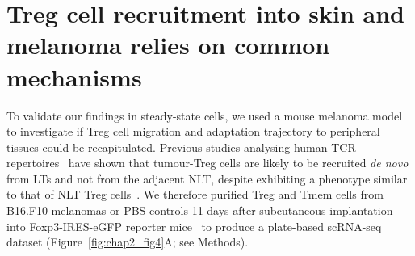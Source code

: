 \section{Treg cell recruitment into skin and melanoma relies on common mechanisms}
\label{section2.5}
To validate our findings in steady-state cells, we used a mouse melanoma model to investigate if Treg cell migration and adaptation trajectory to peripheral tissues could be recapitulated. Previous studies analysing human TCR repertoires~\citep{Sherwood2013-jf,Plitas2016-rg} have shown that tumour-Treg cells are likely to be recruited \textit{de novo} from LTs and not from the adjacent NLT, despite exhibiting a phenotype similar to that of NLT Treg cells~\citep{Plitas2016-rg,De_Simone2016-yo}. We therefore purified Treg and Tmem cells from B16.F10 melanomas or PBS controls 11 days after subcutaneous implantation into Foxp3-IRES-eGFP reporter mice~\citep{Haribhai2007-tk} to produce a plate-based scRNA-seq dataset (Figure~\ref{fig:chap2_fig4}A; see Methods).

